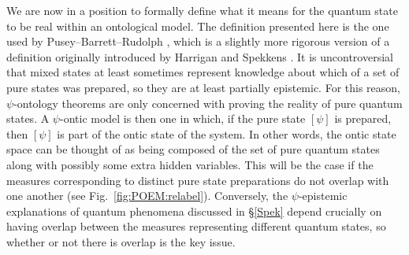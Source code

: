 \documentclass[DIV=calc,fontsize=12pt]{scrartcl} %
\theoremstyle{definition}
\theoremstyle{plain}
\newcommand{\Proj}[1]{\ensuremath{\left [ #1 \right ]}}
\begin{document}
We are now in a position to formally define what it means for the
quantum state to be real within an ontological model.  The definition
presented here is the one used by Pusey--Barrett--Rudolph \cite{Pusey2012}, which is a
slightly more rigorous version of a definition originally introduced
by Harrigan and Spekkens \cite{Harrigan2010}.  It is uncontroversial
that mixed states at least sometimes represent knowledge about which
of a set of pure states was prepared, so they are at least partially
epistemic.  For this reason, $\psi$-ontology theorems are only
concerned with proving the reality of pure quantum states.  A
$\psi$-ontic model is then one in which, if the pure state
$\Proj{\psi}$ is prepared, then $\Proj{\psi}$ is part of the ontic
state of the system.  In other words, the ontic state space can be
thought of as being composed of the set of pure quantum states along
with possibly some extra hidden variables.  This will be the case if
the measures corresponding to distinct pure state preparations do not
overlap with one another (see Fig.~\ref{fig:POEM:relabel}).
Conversely, the $\psi$-epistemic explanations of quantum phenomena
discussed in \S\ref{Spek} depend crucially on having overlap between
the measures representing different quantum states, so whether or not
there is overlap is the key issue.
\end{document}
